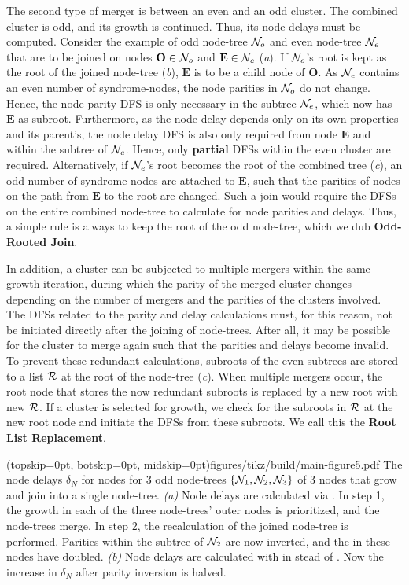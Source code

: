 The second type of merger is between an even and an odd cluster. The combined cluster is odd, and its growth is continued. Thus, its node delays must be computed. Consider the example of odd node-tree $\mathcal{N}_o$ and even node-tree $\mathcal{N}_e$ that are to be joined on nodes $\mathbf{O}\in \mathcal{N}_o$ and $\mathbf{E} \in \mathcal{N}_e$ (\emph{a}). If $\mathcal{N}_o$'s root is kept as the root of the joined node-tree (\emph{b}), $\mathbf{E}$ is to be a child node of $\mathbf{O}$. As $\mathcal{N}_e$ contains an even number of syndrome-nodes, the node parities in $\mathcal{N}_o$ do not change. Hence, the node parity DFS is only necessary in the subtree $\mathcal{N}_e$, which now has $\mathbf{E}$ as subroot. Furthermore, as the node delay depends only on its own properties and its parent's, the node delay DFS is also only required from node $\mathbf{E}$ and within the subtree of $\mathcal{N}_e$. Hence, only \textbf{partial} DFSs within the even cluster are required. %
Alternatively, if $\mathcal{N}_e$'s root becomes the root of the combined tree (\emph{c}), an odd number of syndrome-nodes are attached to $\mathbf{E}$, such that the parities of nodes on the path from $\mathbf{E}$ to the root are changed. Such a join would require the DFSs on the entire combined node-tree to calculate for node parities and delays. Thus, a simple rule is always to keep the root of the odd node-tree, which we dub \textbf{Odd-Rooted Join}.

In addition, a cluster can be subjected to multiple mergers within the same growth iteration, during which the parity of the merged cluster changes depending on the number of mergers and the parities of the clusters involved. The DFSs related to the parity and delay calculations must, for this reason, not be initiated directly after the joining of node-trees. After all, it may be possible for the cluster to merge again such that the parities and delays become invalid. To prevent these redundant calculations, subroots of the even subtrees are stored to a list $\mathcal{R}$ at the root of the node-tree (\emph{c}). When multiple mergers occur, the root node that stores the now redundant subroots is replaced by a new root with new $\mathcal{R}$. If a cluster is selected for growth, we check for the subroots in $\mathcal{R}$ at the new root node and initiate the DFSs from these subroots. We call this the \textbf{Root List Replacement}. 

\Figure[htb](topskip=0pt, botskip=0pt, midskip=0pt){figures/tikz/build/main-figure5.pdf}{
    The node delays $\delta_N$ for nodes for 3 odd node-trees $\{\mathcal{N}_1, \mathcal{N}_2, \mathcal{N}_3\}$ of 3 nodes that grow and join into a single node-tree. \emph{(a)} Node delays are calculated via . In step 1, the growth in each of the three node-trees' outer nodes is prioritized, and the node-trees merge. In step 2, the recalculation of the joined node-tree is performed. Parities within the subtree of $\mathcal{N}_2$ are now inverted, and the  in these nodes have doubled. \emph{(b)} Node delays are calculated with  in stead of . Now the increase in $\delta_N$ after parity inversion is halved.\label{fig5}}

